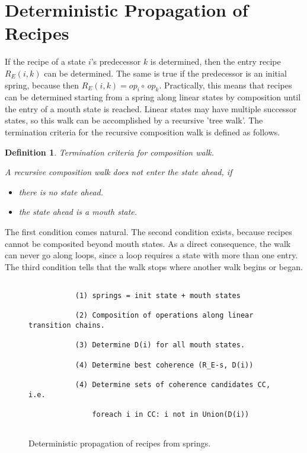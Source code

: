 \documentclass[12pt,a4paper]{scrartcl}
\newtheorem{definition}{Definition}
\begin{document}
%
\section{Deterministic Propagation of Recipes}

If the recipe of a state $i$'s predecessor $k$ is determined, then the entry
recipe $R_E(i,k)$ can be determined. The same is true if the predecessor is an initial
spring, because then $R_E(i,k) = op_i\circ\,op_k$. Practically, this means
that recipes can be determined starting from a spring along linear states by
composition until the entry of a mouth state is reached. Linear states may
have multiple successor states, so this walk can be accomplished by a recursive
'tree walk'.  The termination criteria for the recursive composition walk is
defined as follows.

\begin{definition}
Termination criteria for composition walk.

A recursive composition walk does not enter the state ahead, if 

\begin{itemize}
    \item there is no state ahead.
    \item the state ahead is a mouth state.
\end{itemize}
\end{definition}

The first condition comes natural. The second condition exists, because recipes
cannot be composited beyond mouth states. As a direct consequence, the walk
can never go along loops, since a loop requires a state with more than one
entry. The third condition tells that the walk stops where another walk begins
or began.  

\begin{figure}[htbp] \leavevmode \label{fig:algo-1}
\begin{verbatim}
   
           (1) springs = init state + mouth states

           (2) Composition of operations along linear transition chains.

           (3) Determine D(i) for all mouth states.

           (4) Determine best coherence (R_E-s, D(i))

           (4) Determine sets of coherence candidates CC, i.e.

               foreach i in CC: i not in Union(D(i))


\end{verbatim}

\caption{Deterministic propagation of recipes from springs.}
\end{figure}
\end{document}
